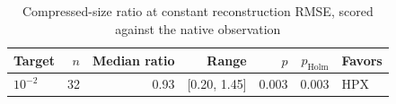 \begin{table}[t]
\centering
\caption{Compressed-size ratio at constant reconstruction RMSE, scored against the native observation}
\label{tab:storage_at_rmse_common}
\footnotesize
\setlength{\tabcolsep}{3pt}
\begin{tabular}{lrrrrrl}
\toprule
Target & $n$ & Median ratio & Range & $p$ & $p_{\mathrm{Holm}}$ & Favors \\
\midrule
$10^{-2}$ & 32 & 0.93 & [0.20, 1.45] & 0.003 & 0.003 & HPX \\
\bottomrule
\end{tabular}
\end{table}
